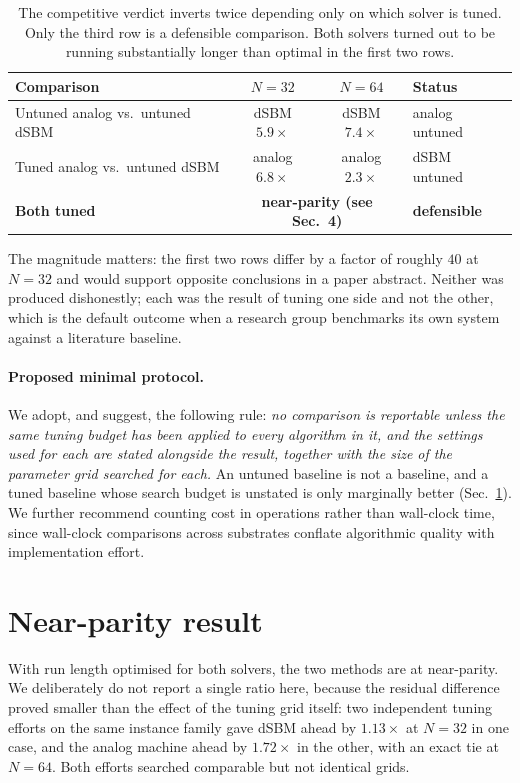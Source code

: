 \documentclass[11pt]{article}
\begin{document}
\begin{table}[h]
\centering
\begin{tabular}{lccl}
\toprule
Comparison & $N=32$ & $N=64$ & Status \\
\midrule
Untuned analog vs.\ untuned dSBM & dSBM $5.9\times$ & dSBM $7.4\times$ & analog untuned \\
Tuned analog vs.\ untuned dSBM   & analog $6.8\times$ & analog $2.3\times$ & dSBM untuned \\
\textbf{Both tuned}              & \multicolumn{2}{c}{\textbf{near-parity (see Sec.~4)}} & \textbf{defensible} \\
\bottomrule
\end{tabular}
\caption{The competitive verdict inverts twice depending only on which solver is
tuned. Only the third row is a defensible comparison. Both solvers turned out to
be running substantially longer than optimal in the first two rows.}
\label{tab:invert}
\end{table}

The magnitude matters: the first two rows differ by a factor of roughly $40$ at
$N=32$ and would support opposite conclusions in a paper abstract. Neither was
produced dishonestly; each was the result of tuning one side and not the other,
which is the default outcome when a research group benchmarks its own system
against a literature baseline.

\paragraph{Proposed minimal protocol.}
We adopt, and suggest, the following rule: \emph{no comparison is reportable
unless the same tuning budget has been applied to every algorithm in it, and the
settings used for each are stated alongside the result, together with the size
of the parameter grid searched for each.} An untuned baseline is not a
baseline, and a tuned baseline whose search budget is unstated is only
marginally better (Sec.~\ref{sec:parity}). We further recommend counting cost in operations rather than
wall-clock time, since wall-clock comparisons across substrates conflate
algorithmic quality with implementation effort.

\section{Near-parity result}
\label{sec:parity}

With run length optimised for both solvers, the two methods are at near-parity.
We deliberately do not report a single ratio here, because the residual
difference proved smaller than the effect of the tuning grid itself: two
independent tuning efforts on the same instance family gave dSBM ahead by
$1.13\times$ at $N=32$ in one case, and the analog machine ahead by $1.72\times$
in the other, with an exact tie at $N=64$. Both efforts searched comparable but
not identical grids.
\end{document}
